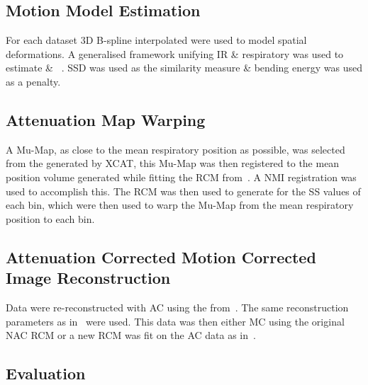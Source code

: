     \subsection{Motion Model Estimation} \label{sec:motion_model_estimation}
        For each dataset \gls{3D} B-spline interpolated  were used to model spatial deformations. A generalised framework unifying \gls{IR} \& respiratory  was used to estimate  \& ~\cite{McClelland2017}. \gls{SSD} was used as the similarity measure \& bending energy was used as a penalty.%
    
    \subsection{Attenuation Map Warping} \label{sec:attenuation_map_warping}
        A \gls{Mu-Map}, as close to the mean respiratory position as possible, was selected from the  generated by \gls{XCAT}, this \gls{Mu-Map} was then registered to the mean position volume generated while fitting the \gls{RCM} from~. A \gls{NMI} registration was used to accomplish this.%
        The \gls{RCM} was then used to generate  for the \gls{SS} values of each bin, which were then used to warp the \gls{Mu-Map} from the mean respiratory position to each bin.
        
    \subsection{Attenuation Corrected Motion Corrected Image Reconstruction} \label{sec:attenuation_corrected_image_reconstruction}
        Data were re-reconstructed with \gls{AC} using the  from~. The same reconstruction parameters as in~ were used. This data was then either \gls{MC} using the original \gls{NAC} \gls{RCM} or a new \gls{RCM} was fit on the \gls{AC} data as in~.
    
    \subsection{Evaluation} \label{sec:evaluation}
        
